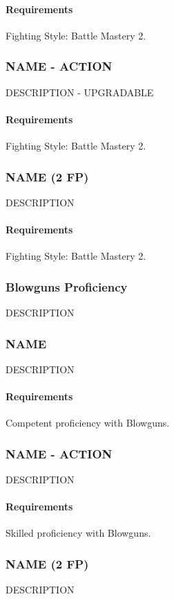     \paragraph{Requirements} Fighting Style: Battle Mastery 2.
\subsubsection{NAME - ACTION} \label{feat::name}
    DESCRIPTION - UPGRADABLE
    \paragraph{Requirements} Fighting Style: Battle Mastery 2.
\subsubsection{NAME (2 FP)} \label{feat::name}
    DESCRIPTION
    \paragraph{Requirements} Fighting Style: Battle Mastery 2.

\subsubsection{Blowguns Proficiency} \label{feat::name}
    DESCRIPTION
\subsubsection{NAME} \label{feat::name}
    DESCRIPTION
    \paragraph{Requirements} Competent proficiency with Blowguns.
\subsubsection{NAME - ACTION} \label{feat::name}
    DESCRIPTION
    \paragraph{Requirements} Skilled proficiency with Blowguns.
\subsubsection{NAME (2 FP)} \label{feat::name}
    DESCRIPTION
